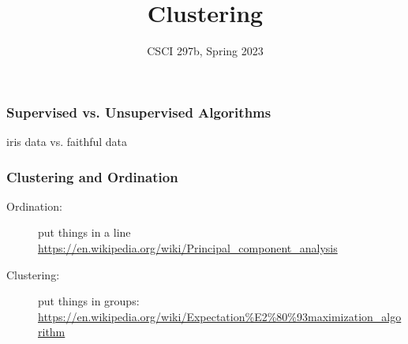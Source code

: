 \documentclass{beamer}
\title{Clustering}
\author{CSCI 297b, Spring 2023}
\newcommand{\li}{\item}
\newcommand{\bfr}[1]{\begin{frame}[fragile]\frametitle{{ #1 }}}
\begin{document}
\begin{frame}
\maketitle
\end{frame}

\bfr{Supervised vs. Unsupervised Algorithms}
iris data vs. faithful data
\end{frame}

\bfr{Clustering and Ordination}
\begin{description}
\li[Ordination:]  put things in a line\\
 \url{https://en.wikipedia.org/wiki/Principal_component_analysis}
\li[Clustering:] put things in groups:\\
\url{https://en.wikipedia.org/wiki/Expectation%E2%80%93maximization_algorithm}
\end{description}
\end{frame}
\end{document}
